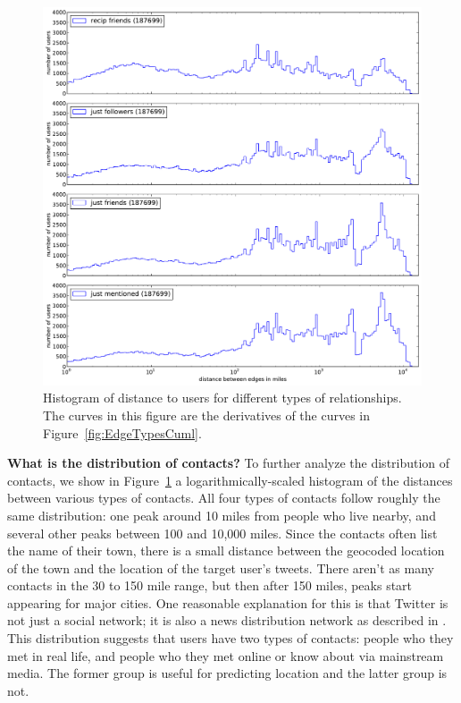 \documentclass[letterpaper]{article}
\begin{document}
\begin{figure}[tbh]
\centering
\includegraphics[width=.9\linewidth]{figures/edge_types_norm.pdf}
\caption{
Histogram of distance to users for different types of relationships.
The curves in this figure are the derivatives of the curves in
Figure~\ref{fig:EdgeTypesCuml}.
}
\label{fig:EdgeTypes}
\end{figure}


\medskip
\noindent\textbf{What is the distribution of contacts?} To further analyze the distribution of contacts, we show in Figure~\ref{fig:EdgeTypes} a logarithmically-scaled
histogram of the distances between various types of contacts.
%
All four types of contacts follow roughly the same
distribution: one peak around 10 miles from people who live nearby, and several
other peaks between 100 and 10,000 miles.
%
Since the contacts often list the name of their town, there is a small distance
between the geocoded location of the town and the location of the target
user's tweets.
%
There aren't as many contacts in the 30 to 150 mile range, but then after 150
miles, peaks start appearing for major cities.
%
One reasonable explanation for this is that Twitter is not just a social
network; it is also a news distribution network as described in
\cite{kwak2010why}.
%
This distribution suggests that users have two types of contacts: people who
they met in real life, and people who they met online or know about via
mainstream media.
%
The former group is useful for predicting location and the latter group is not.
\end{document}

